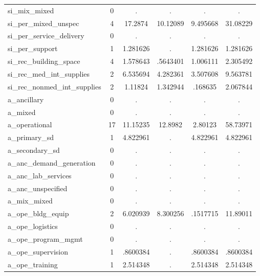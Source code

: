 \begin{table}[htbp]
\begin{tabular}{l*{1}{ccccc}}
si\_mix\_mixed&           0&           .&           .&           .&           .\\
si\_per\_mixed\_unspec&           4&     17.2874&    10.12089&    9.495668&    31.08229\\
si\_per\_service\_delivery&           0&           .&           .&           .&           .\\
si\_per\_support&           1&    1.281626&           .&    1.281626&    1.281626\\
si\_rec\_building\_space&           4&    1.578643&    .5643401&    1.006111&    2.305492\\
si\_rec\_med\_int\_supplies&           2&    6.535694&    4.282361&    3.507608&    9.563781\\
si\_rec\_nonmed\_int\_supplies&           2&     1.11824&    1.342944&     .168635&    2.067844\\
a\_ancillary &           0&           .&           .&           .&           .\\
a\_mixed     &           0&           .&           .&           .&           .\\
a\_operational&          17&    11.15235&     12.8982&     2.80123&    58.73971\\
a\_primary\_sd&           1&    4.822961&           .&    4.822961&    4.822961\\
a\_secondary\_sd&           0&           .&           .&           .&           .\\
a\_anc\_demand\_generation&           0&           .&           .&           .&           .\\
a\_anc\_lab\_services&           0&           .&           .&           .&           .\\
a\_anc\_unspecified&           0&           .&           .&           .&           .\\
a\_mix\_mixed &           0&           .&           .&           .&           .\\
a\_ope\_bldg\_equip&           2&    6.020939&    8.300256&    .1517715&    11.89011\\
a\_ope\_logistics&           0&           .&           .&           .&           .\\
a\_ope\_program\_mgmt&           0&           .&           .&           .&           .\\
a\_ope\_supervision&           1&    .8600384&           .&    .8600384&    .8600384\\
a\_ope\_training&           1&    2.514348&           .&    2.514348&    2.514348\\

\end{tabular}
\end{table}

